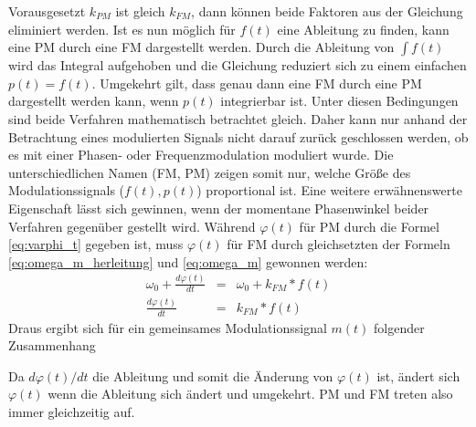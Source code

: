 Vorausgesetzt \(k_{PM}\) ist gleich \(k_{FM}\), dann können beide Faktoren aus der Gleichung eliminiert werden. Ist es nun möglich für \(f(t)\) eine Ableitung zu finden, kann eine PM durch eine FM dargestellt werden. Durch die Ableitung von \(\int{f(t)}\) wird das Integral aufgehoben und die Gleichung reduziert sich zu einem einfachen \(p(t)=f(t)\). Umgekehrt gilt, dass genau dann eine FM durch eine PM dargestellt werden kann, wenn \(p(t)\) integrierbar ist. Unter diesen Bedingungen sind beide Verfahren mathematisch betrachtet gleich. Daher kann nur anhand der Betrachtung eines modulierten Signals nicht darauf zurück geschlossen werden, ob es mit einer Phasen- oder Frequenzmodulation moduliert wurde. Die unterschiedlichen Namen (FM, PM) zeigen somit nur, welche Größe des Modulationssignals (\(f(t), p(t)\)) proportional ist. \cite[S. 210]{lathi}
Eine weitere erwähnenswerte Eigenschaft lässt sich gewinnen, wenn der momentane Phasenwinkel beider Verfahren gegenüber gestellt wird. Während \(\varphi(t)\) für PM durch die Formel \ref{eq:varphi_t} gegeben ist, muss \(\varphi(t)\) für FM durch gleichsetzten der Formeln \ref{eq:omega_m_herleitung} und \ref{eq:omega_m} gewonnen werden:
\begin{eqnarray*}
\omega_0+\frac{d\varphi(t)}{dt}&=&\omega_0+k_{FM}*f(t) \\
\frac{d\varphi(t)}{dt}&=&k_{FM}*f(t)
\end{eqnarray*}
Draus ergibt sich für ein gemeinsames Modulationssignal \(m(t)\) folgender Zusammenhang
\begin{center}
\end{center}
Da \({d\varphi(t)}/{dt}\) die Ableitung und somit die Änderung von \(\varphi(t)\) ist, ändert sich \(\varphi(t)\) wenn die Ableitung sich ändert und umgekehrt. PM und FM treten also immer gleichzeitig auf.

